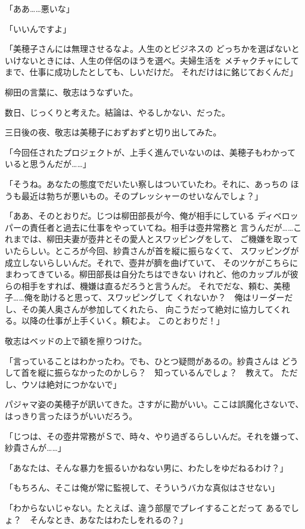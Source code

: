 ﻿\documentclass[
    book,tate,
    line_length=30zw,
    jafontsize=12pt,
    paper=b5j,
    landscape,
    ]{jlreq}
\begin{document}
「ああ……悪いな」

「いいんですよ」

「美穂子さんには無理させるなよ。人生のとビジネスの
どっちかを選ばないといけないときには、人生の伴侶のほうを選べ。夫婦生活を
メチャクチャにしてまで、仕事に成功したとしても、しいだけだ。
それだけはに銘じておくんだ」

柳田の言葉に、敬志はうなずいた。

数日、じっくりと考えた。結論は、やるしかない、だった。

三日後の夜、敬志は美穂子におずおずと切り出してみた。

「今回任されたプロジェクトが、上手く進んでいないのは、美穂子もわかって
いると思うんだが……」

「そうね。あなたの態度でだいたい察しはついていたわ。それに、あっちの
ほうも最近は勃ちが悪いもの。そのプレッシャーのせいなんでしょ？」

「ああ、そのとおりだ。じつは柳田部長が今、俺が相手にしている
ディベロッパーの責任者と過去に仕事をやっていてね。相手は壺井常務と
言うんだが……これまでは、柳田夫妻が壺井とその愛人とスワッピングをして、
ご機嫌を取っていたらしい。ところが今回、紗貴さんが首を縦に振らなくて、
スワッピングが成立しないらしいんだ。それで、壺井が臍を曲げていて、
そのツケがこちらにまわってきている。柳田部長は自分たちはできない
けれど、他のカップルが彼らの相手をすれば、機嫌は直るだろうと言うんだ。
それでだな、頼む、美穂子……俺を助けると思って、スワッピングして
くれないか？　俺はリーダーだし、その美人奥さんが参加してくれたら、
向こうだって絶対に協力してくれる。以降の仕事が上手くいく。頼むよ。
このとおりだ！」

敬志はベッドの上で額を擦りつけた。

「言っていることはわかったわ。でも、ひとつ疑問があるの。紗貴さんは
どうして首を縦に振らなかったのかしら？　知っているんでしょ？　教えて。
ただし、ウソは絶対につかないで」

パジャマ姿の美穂子が訊いてきた。さすがに勘がいい。ここは誤魔化さないで、
はっきり言ったほうがいいだろう。

「じつは、その壺井常務がＳで、時々、やり過ぎるらしいんだ。それを嫌って、
紗貴さんが……」

「あなたは、そんな暴力を振るいかねない男に、わたしをゆだねるわけ？」

「もちろん、そこは俺が常に監視して、そういうバカな真似はさせない」

「わからないじゃない。たとえば、違う部屋でプレイすることだって
あるでしょ？　そんなとき、あなたはわたしをれるの？」
\end{document}
